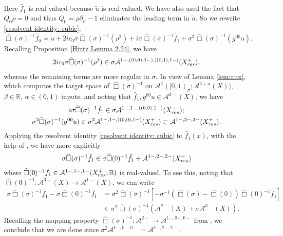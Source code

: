 \documentclass[10pt,a4paper,reqno]{amsart}
\newcommand{\RR}{\mathbb{R}}
\newcommand{\A}{\mathcal{A}}
\newcommand{\pa}{\partial}
\newcommand{\ti}{\tilde}
\theoremstyle{definition}
\theoremstyle{remark}
\numberwithin{equation}{section}
\newcommand{\xs}{\sigma}
\newcommand{\R}{\mathbb R}
\newcommand{\wh}{\widehat}
\begin{document}
Here $\ti{f_1}$ is real-valued because $\ti u$ is real-valued. We have also used the fact that $Q_0 \rho = 0$ and thus $Q_0=\rho\pa_\rho - 1$ eliminates the leading term in $\ti u$. So we rewrite \eqref{resolvent identity: cubic},
\begin{equation}
\label{resolvent full expansion}
    \wh\Box(\sigma)^{-1} \wh{f}_0 = u + 2ic_0\sigma\wh\Box(\sigma)^{-1}(\rho^2) + i\sigma\wh\Box(\sigma)^{-1}\ti{f_1} + \sigma^2 \wh\Box(\sigma)^{-1}(g^{00}u).
\end{equation}
Recalling Proposition \ref{Hintz Lemma 2.24}, we have
\[
    2ic_0 \sigma\wh\Box(\sigma)^{-1}(\rho^2) \in \sigma\A^{1-,((0,0),1-),((0,1),1-)}(X^+_{\rm res}),
\]
whereas the remaining terms are more regular in $\sigma$. In view of Lemma \ref{lem:aux}, which computes the target space of $\wh\Box(\xs)^{-1}$ on $\A^\beta([0,1)_\xs;\A^{2+\alpha}(X))$, $\beta \in \RR$, $\alpha\in (0,1)$ inputs, and noting that $\ti{f_1}, g^{00}u\in \A^{3-}(X)$, we have
\[
    \begin{gathered}
        i \sigma\wh\Box(\sigma)^{-1} \ti{f_1} \in \sigma \A^{1-, 1-, ((0,0),1-)}(X^+_{\rm res}); \\
        \sigma^2\wh\Box(\sigma)^{-1} (g^{00}u)\in \sigma^2 \A^{1-, 1-, ((0,0),1-)}(X^+_{\rm res})\subset \A^{1-,2-,2-}(X^+_{\rm res}).
    \end{gathered}
\]
Applying the resolvent identity \eqref{resolvent identity: cubic} to $\ti{f_1}(x)$, with the help of \cite[Lemma 2.17]{Hin22} , we have more explicitly
\[
    \sigma\wh\Box(\sigma)^{-1} \ti{f_1} \in \sigma \wh\Box(0)^{-1} \ti{f_1} + \A^{1-,2-,2-}(X^+_{\rm res})
\]
where $\wh\Box(0)^{-1} \ti{f_1} \in \A^{1-,1-,1-}(X^+_{\rm res};\R)$ is real-valued. To see this, noting that $\wh\Box(0)^{-1} : \A^{3-}(X) \to \A^{1-}(X)$, we can write
\[
\begin{split}
	\sigma\wh\Box(\sigma)^{-1} \ti{f_1} - \sigma \wh\Box(0)^{-1} \ti{f_1}
	& = \sigma^2 \wh\Box(\sigma)^{-1}[-\sigma^{-1}(\wh\Box(\sigma) - \wh\Box(0))\wh\Box(0)^{-1} \ti{f_1}] \\
	&\in \sigma^2 \wh\Box(\sigma)^{-1} (\A^{2-}(X)+\sigma\A^{3-}(X)).
\end{split}
\]
Recalling the mapping property $\wh\Box(\xs)^{-1}:\A^{2-}\to \A^{1-,0-,0-}$ from \cite[Lemma 2.17]{Hin22}, we conclude that we are done since $\xs^2\A^{1-,0-,0-}= \A^{1-,2-,2-}$.
\end{document}
